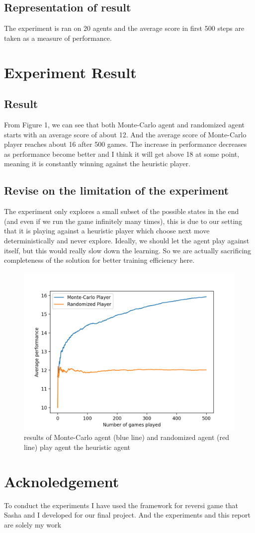 \documentclass[12pt]{article}
\begin{document}
\subsection{Representation of result}
The experiment is ran on 20 agents and the average score in first 500 steps are taken as a measure of performance. 

\section{Experiment Result}

\subsection{Result}
From Figure 1, we can see that both Monte-Carlo agent and randomized agent starts with an average score of about 12. And the average score of Monte-Carlo player reaches about 16 after 500 games. The increase in performance decreases as performance become better and I think it will get above 18 at some point, meaning it is constantly winning against the heuristic player.

\subsection{Revise on the limitation of the experiment}
The experiment only explores a small subset of the possible states in the end (and even if we run the game infinitely many times), this is due to our setting that it is playing against a heuristic player which choose next move deterministically and never explore. Ideally, we should let the agent play against itself, but this would really slow down the learning. So we are actually sacrificing completeness of the solution for better training efficiency here.
\begin{figure}
  \centering
     \includegraphics[scale = 0.6]{1.png}
  \caption{results of Monte-Carlo agent (blue line) and randomized agent (red line) play agent the heuristic agent }
\end{figure}

\section{Acknoledgement}
To conduct the experiments I have used the framework for reversi game that Sasha and I developed for our final project. And the experiments and this report are solely my work
\end{document}

